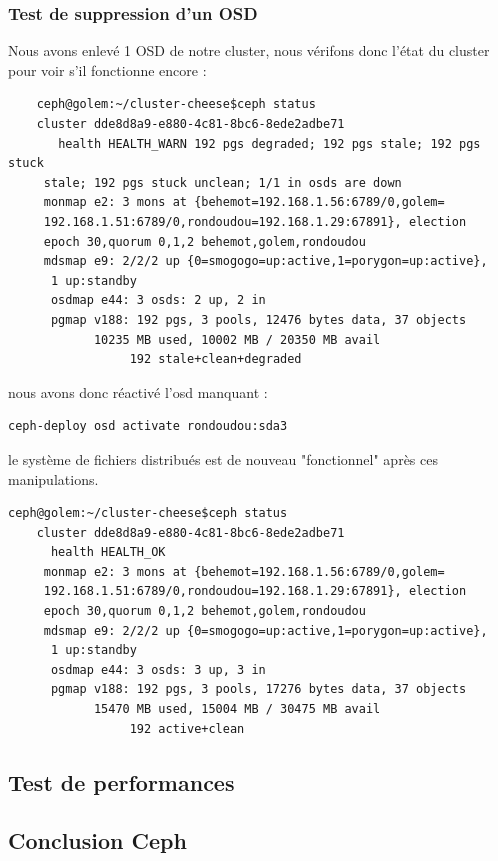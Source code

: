 \documentclass[12pt]{article}
\begin{document}
	\subsubsection{Test de suppression d'un OSD}
	Nous avons enlevé 1 OSD de notre cluster, nous vérifons donc l'état du cluster pour voir s'il fonctionne encore :
	
	\begin{verbatim}
	ceph@golem:~/cluster-cheese$ceph status     
    cluster dde8d8a9-e880-4c81-8bc6-8ede2adbe71
       health HEALTH_WARN 192 pgs degraded; 192 pgs stale; 192 pgs stuck
     stale; 192 pgs stuck unclean; 1/1 in osds are down  
     monmap e2: 3 mons at {behemot=192.168.1.56:6789/0,golem=
     192.168.1.51:6789/0,rondoudou=192.168.1.29:67891}, election 
     epoch 30,quorum 0,1,2 behemot,golem,rondoudou 
     mdsmap e9: 2/2/2 up {0=smogogo=up:active,1=porygon=up:active},
      1 up:standby
      osdmap e44: 3 osds: 2 up, 2 in 
      pgmap v188: 192 pgs, 3 pools, 12476 bytes data, 37 objects 
            10235 MB used, 10002 MB / 20350 MB avail 
                 192 stale+clean+degraded
\end{verbatim}	 

nous avons donc réactivé l'osd manquant :
\begin{verbatim}
ceph-deploy osd activate rondoudou:sda3
\end{verbatim}
le système de fichiers distribués est de nouveau "fonctionnel" après ces manipulations. 
\begin{verbatim}
ceph@golem:~/cluster-cheese$ceph status     
    cluster dde8d8a9-e880-4c81-8bc6-8ede2adbe71
      health HEALTH_OK  
     monmap e2: 3 mons at {behemot=192.168.1.56:6789/0,golem=
     192.168.1.51:6789/0,rondoudou=192.168.1.29:67891}, election 
     epoch 30,quorum 0,1,2 behemot,golem,rondoudou 
     mdsmap e9: 2/2/2 up {0=smogogo=up:active,1=porygon=up:active},
      1 up:standby
      osdmap e44: 3 osds: 3 up, 3 in 
      pgmap v188: 192 pgs, 3 pools, 17276 bytes data, 37 objects 
            15470 MB used, 15004 MB / 30475 MB avail 
                 192 active+clean 
\end{verbatim}
    
	\subsection{Test de performances}
	
	
  
\subsection{Conclusion Ceph}
\newpage
\end{document}
